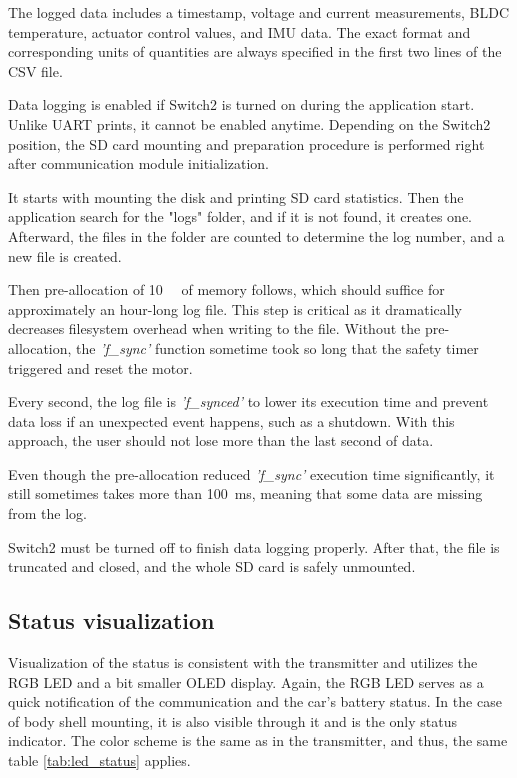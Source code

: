 The logged data includes a timestamp, voltage and current measurements, BLDC temperature, actuator control values, and IMU data. The exact format and corresponding units of quantities are always specified in the first two lines of the CSV file.

Data logging is enabled if Switch2 is turned on during the application start. Unlike UART prints, it cannot be enabled anytime. Depending on the Switch2 position, the SD card mounting and preparation procedure is performed right after communication module initialization.

It starts with mounting the disk and printing SD card statistics. Then the application search for the "logs" folder, and if it is not found, it creates one. Afterward, the files in the folder are counted to determine the log number, and a new file is created.

Then pre-allocation of \SI{10}{\mebi\byte} of memory follows, which should suffice for approximately an \mbox{hour-long} log file. This step is critical as it dramatically decreases filesystem overhead when writing to the file. Without the pre-allocation, the \textit{'f\_sync'} function sometime took so long that the safety timer triggered and reset the motor.

Every second, the log file is \textit{'f\_synced'} to lower its execution time and prevent data loss if an unexpected event happens, such as a shutdown. With this approach, the user should not lose more than the last second of data.

Even though the pre-allocation reduced \textit{'f\_sync'} execution time significantly, it still sometimes takes more than \SI{100}{\ms}, meaning that some data are missing from the log.

Switch2 must be turned off to finish data logging properly. After that, the file is truncated and closed, and the whole SD card is safely unmounted.

\subsection{Status visualization}
Visualization of the status is consistent with the transmitter and utilizes the RGB LED and a bit smaller OLED display. Again, the RGB LED serves as a quick notification of the communication and the car's battery status. In the case of body shell mounting, it is also visible through it and is the only status indicator. The color scheme is the same as in the transmitter, and thus, the same table \ref{tab:led_status} applies.

